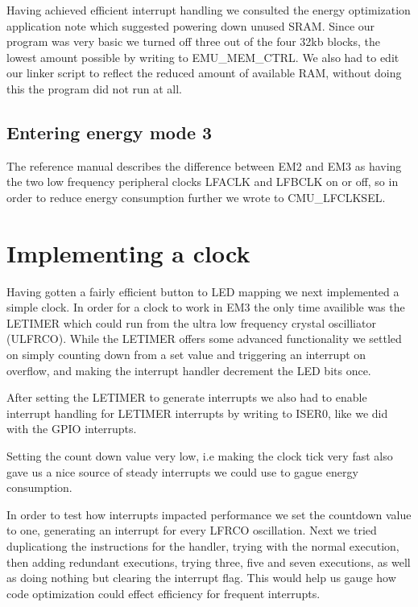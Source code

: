 Having achieved efficient interrupt handling we consulted the energy optimization application note which suggested powering down unused SRAM. Since our program was very basic we turned off three out of the four 32kb blocks, the lowest amount possible by writing to EMU\_MEM\_CTRL. We also had to edit our linker script to reflect the reduced amount of available RAM, without doing this the program did not run at all.

\subsection{Entering energy mode 3}

The reference manual describes the difference between EM2 and EM3 as having the two low frequency peripheral clocks LFACLK and LFBCLK on or off, so in order to reduce energy consumption further we wrote to CMU\_LFCLKSEL.

\section{Implementing a clock}

Having gotten a fairly efficient button to LED mapping we next implemented a simple clock. In order for a clock to work in EM3 the only time availible was the LETIMER which could run from the ultra low frequency crystal oscilliator (ULFRCO). While the LETIMER offers some advanced functionality we settled on simply counting down from a set value and triggering an interrupt on overflow, and making the interrupt handler decrement the LED bits once.

After setting the LETIMER to generate interrupts we also had to enable interrupt handling for LETIMER interrupts by writing to ISER0, like we did with the GPIO interrupts. 

Setting the count down value very low, i.e making the clock tick very fast also gave us a nice source of steady interrupts we could use to gague energy consumption.

In order to test how interrupts impacted performance we set the countdown value to one, generating an interrupt for every LFRCO oscillation. Next we tried duplicationg the instructions for the handler, trying with the normal execution, then adding redundant executions, trying three, five and seven executions, as well as doing nothing but clearing the interrupt flag. This would help us gauge how code optimization could effect efficiency for frequent interrupts.
